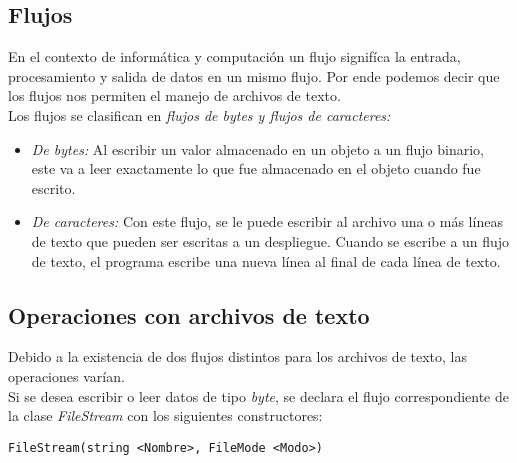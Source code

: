 \documentclass[letterpaper, 12pt]{article}
\begin{document}
\begin{justify}
        \subsection{Flujos}
        En el contexto de informática y computación un flujo signifíca la entrada, procesamiento y salida de datos en un mismo flujo. Por ende podemos decir que los flujos nos permiten el manejo de archivos de texto.
        \newline
        \\
        Los flujos se clasifican en \emph{flujos de bytes y flujos de caracteres:}
        \begin{itemize}
            \item \emph{De bytes:} Al escribir un valor almacenado en un objeto a un flujo binario, este va a leer exactamente lo que fue almacenado en el objeto cuando fue escrito.
            \item \emph{De caracteres:} Con este flujo, se le puede escribir al archivo una o más líneas de texto que pueden ser escritas a un despliegue. Cuando se escribe a un flujo de texto, el programa escribe una nueva línea
            al final de cada línea de texto.
        \end{itemize}
        \subsection{Operaciones con archivos de texto}
        Debido a la existencia de dos flujos distintos para los archivos de texto, las operaciones varían.
        \newline
        \\
        Si se desea escribir o leer datos de tipo \emph{byte}, se declara el flujo correspondiente de la clase \emph{FileStream} con los siguientes constructores:
            \begin{verbatim}
FileStream(string <Nombre>, FileMode <Modo>)


\end{verbatim}
\end{justify}
\end{document}

